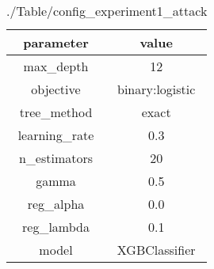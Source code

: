 \begin{table}[h]
\centering
\begin{tabular}{|c|c|}
\hline
parameter & value\\
\hline
max_depth & 12 \\\hline
objective & binary:logistic \\\hline
tree_method & exact \\\hline
learning_rate & 0.3 \\\hline
n_estimators & 20 \\\hline
gamma & 0.5 \\\hline
reg_alpha & 0.0 \\\hline
reg_lambda & 0.1 \\\hline
model & XGBClassifier \\\hline

\end{tabular}\caption{./Table/config_experiment1_attack}
\label{tab:./Table/config_experiment1_attack}
\end{table}
